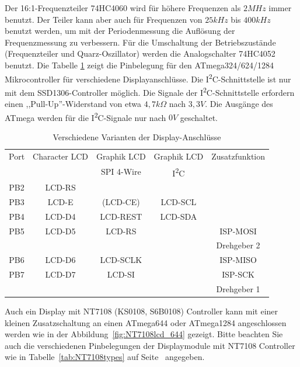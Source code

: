 Der 16:1-Frequenzteiler 74HC4060 wird für höhere Frequenzen als \(2MHz\) immer benutzt.
Der Teiler kann aber auch für Frequenzen von \(25kHz\) bis \(400kHz\) benutzt werden, um mit der
Periodenmessung die Auflösung der Frequenzmessung zu verbessern.
Für die Umschaltung der Betriebszustände (Frequenzteiler und Quarz-Oszillator) werden
die Analogschalter 74HC4052 benutzt.
Die Tabelle \ref{tab:mega644-display} zeigt die Pinbelegung für den ATmega324/624/1284 Mikrocontroller für verschiedene Displayanschlüsse.
Die I\textsuperscript{2}C-Schnittstelle ist nur mit dem SSD1306-Controller möglich.
Die Signale der I\textsuperscript{2}C-Schnittstelle erfordern einen ,,Pull-Up''-Widerstand von etwa \(4,7k\Omega\) nach \(3,3V\).
Die Ausgänge des ATmega werden für die I\textsuperscript{2}C-Signale nur nach \(0V\) geschaltet.


\begin{table}[H]
  \begin{center}
    \begin{tabular}{| c || c | c | c | c |}
    \hline
      Port & Character LCD &  Graphik LCD & Graphik LCD  & Zusatzfunktion      \\
           &               &  SPI 4-Wire  &  I\textsuperscript{2}C         &                     \\
    \hline
    \hline
    PB2    &  LCD-RS         &            &             &       \\
    \hline
    PB3    &  LCD-E          & (LCD-CE)   &  LCD-SCL    &       \\
    \hline
    PB4    &  LCD-D4         & LCD-REST   &  LCD-SDA    &       \\
    \hline
    PB5    &  LCD-D5         & LCD-RS     &             & ISP-MOSI \\
           &                 &            &             & Drehgeber 2 \\
    \hline
    PB6    &  LCD-D6         & LCD-SCLK   &             & ISP-MISO \\
    \hline
    PB7    &  LCD-D7         & LCD-SI     &             & ISP-SCK  \\
           &                 &            &             & Drehgeber 1 \\
    \hline
    \end{tabular}
  \end{center}
  \caption{Verschiedene Varianten der Display-Anschlüsse}
  \label{tab:mega644-display}
\end{table}

Auch ein Display mit NT7108 (KS0108, S6B0108) Controller kann mit einer kleinen Zusatzschaltung an einen
ATmega644 oder ATmega1284 angeschlossen werden wie in der Abbildung~\ref{fig:NT7108lcd_644} gezeigt.
Bitte beachten Sie auch die verschiedenen Pinbelegungen der Displaymodule mit NT7108 Controller wie in
Tabelle~\ref{tab:NT7108types} auf Seite~\pageref{tab:NT7108types} angegeben.

